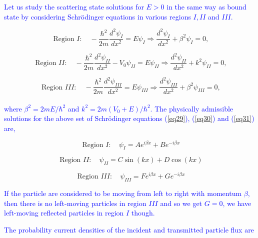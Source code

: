 \documentclass{article}
\begin{document}
\textcolor{blue}{Let us study the scattering state solutions for $E>0$ in the same way as bound state by considering Schrödinger equations in various regions $I, I I$ and $I I I .$}

\begin{equation}
    \text { Region } I: \quad-\frac{\hbar^{2}}{2 m} \frac{d^{2} \psi_{I}}{d x^{2}}=E \psi_{I} \Rightarrow \frac{d^{2} \psi_{I}}{d x^{2}}+\beta^{2} \psi_{I}=0,
    \label{eq29}
\end{equation}

\begin{equation}
    \text { Region } I I: \quad-\frac{\hbar^{2}}{2 m} \frac{d^{2} \psi_{I I}}{d x^{2}}-V_{0} \psi_{I I}=E \psi_{I I} \Rightarrow \frac{d^{2} \psi_{I I}}{d x^{2}}+k^{2} \psi_{I I}=0,
    \label{eq30}
\end{equation}

\begin{equation}
    \text { Region } I I I: \quad-\frac{\hbar^{2}}{2 m} \frac{d^{2} \psi_{I I I}}{d x^{2}}=E \psi_{I I I} \Rightarrow \frac{d^{2} \psi_{I I I}}{d x^{2}}+\beta^{2} \psi_{I I I}=0,
    \label{eq31}
\end{equation}
\\
\textcolor{blue}{where $\beta^{2}=2 m E / \hbar^{2}$ and $k^{2}=2 m\left(V_{0}+E\right) / \hbar^{2}$. The physically admissible solutions for the above set of Schrödinger equations (\ref{eq29}), (\ref{eq30}) and (\ref{eq31}) are,}

\begin{equation}
    \text { Region } I: \quad \psi_{I}=A e^{i \beta x}+B e^{-i \beta x}
\end{equation}

\begin{equation}
    \text { Region } I I: \quad \psi_{I I}=C \sin (k x)+D \cos (k x)
\end{equation}

\begin{equation}
    \text { Region } I I I: \quad \psi_{I I I}=F e^{i \beta x}+G e^{-i \beta x}
\end{equation}

\textcolor{blue}{If the particle are considered to be moving from left to right with momentum $\beta$, then there is no left-moving particles in region $I I I$ and so we get $G=0$, we have left-moving reflected particles in region $I$ though.}

\textcolor{blue}{The probability current densities of the incident and transmitted particle flux are}
\end{document}

